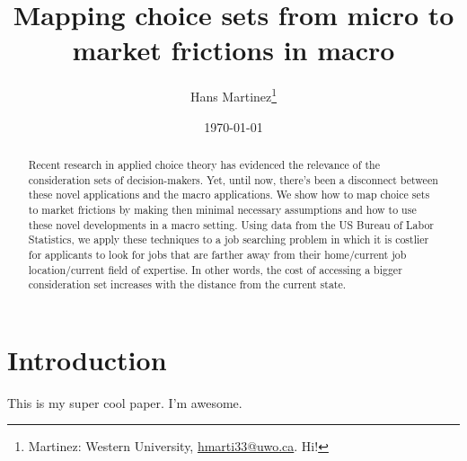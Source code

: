 \documentclass[AER]{AEA}
\begin{document}
\title{Mapping choice sets from micro to market frictions in macro}



\author{
  Hans Martinez\thanks{
  Martinez: Western
University, \href{mailto:hmarti33@uwo.ca}{hmarti33@uwo.ca}.
  Hi!
}
}

\date{\today}

\begin{abstract}
Recent research in applied choice theory has evidenced the relevance of
the consideration sets of decision-makers. Yet, until now, there's been
a disconnect between these novel applications and the macro
applications. We show how to map choice sets to market frictions by
making then minimal necessary assumptions and how to use these novel
developments in a macro setting. Using data from the US Bureau of Labor
Statistics, we apply these techniques to a job searching problem in
which it is costlier for applicants to look for jobs that are farther
away from their home/current job location/current field of expertise. In
other words, the cost of accessing a bigger consideration set increases
with the distance from the current state.
\end{abstract}


\maketitle

\hypertarget{introduction}{%
\section*{Introduction}\label{introduction}}

This is my super cool paper. I'm awesome.
\end{document}
